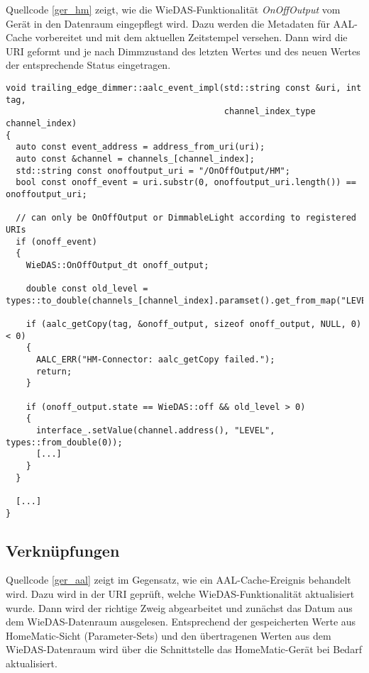 Quellcode \ref{ger_hm} zeigt, wie die WieDAS-Funktionalität \emph{OnOffOutput} vom Gerät
in den Datenraum eingepflegt wird.
Dazu werden die Metadaten für AAL-Cache vorbereitet und mit dem aktuellen Zeitstempel versehen.
Dann wird die URI geformt und je nach Dimmzustand des letzten Wertes und des neuen Wertes
der entsprechende Status eingetragen.

\lstset{language=C++}
\begin{lstlisting}[frame=single,caption={Ausschnitt der Implementierung für die AAL-Cache-Ereignisbehandlung eines Dimmers},label=ger_aal]
void trailing_edge_dimmer::aalc_event_impl(std::string const &uri, int tag,
                                           channel_index_type channel_index)
{
  auto const event_address = address_from_uri(uri);
  auto const &channel = channels_[channel_index];
  std::string const onoffoutput_uri = "/OnOffOutput/HM";
  bool const onoff_event = uri.substr(0, onoffoutput_uri.length()) == onoffoutput_uri;

  // can only be OnOffOutput or DimmableLight according to registered URIs
  if (onoff_event)
  {
    WieDAS::OnOffOutput_dt onoff_output;

    double const old_level = types::to_double(channels_[channel_index].paramset().get_from_map("LEVEL"));

    if (aalc_getCopy(tag, &onoff_output, sizeof onoff_output, NULL, 0) < 0)
    {
      AALC_ERR("HM-Connector: aalc_getCopy failed.");
      return;
    }

    if (onoff_output.state == WieDAS::off && old_level > 0)
    {
      interface_.setValue(channel.address(), "LEVEL", types::from_double(0));
      [...]
    }
  }

  [...]
}
\end{lstlisting}

\subsection{Verknüpfungen}
\label{imp_verknüpfungen}
Quellcode \ref{ger_aal} zeigt im Gegensatz, wie ein AAL-Cache-Ereignis behandelt wird.
Dazu wird in der URI geprüft, welche WieDAS-Funktionalität aktualisiert wurde.
Dann wird der richtige Zweig abgearbeitet und zunächst das Datum aus dem WieDAS-Datenraum ausgelesen.
Entsprechend der gespeicherten Werte aus HomeMatic-Sicht (Parameter-Sets) und den übertragenen Werten
aus dem WieDAS-Datenraum wird über die Schnittstelle das HomeMatic-Gerät bei Bedarf aktualisiert.

